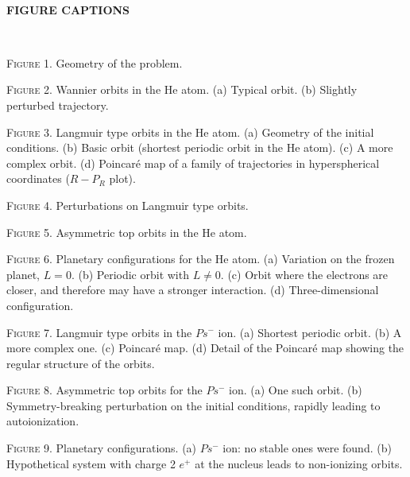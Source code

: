 \documentclass[thmsa]{article}
\begin{document}
\newpage 

\pagestyle{empty}\ 

\textbf{{\large \textbf{FIGURE CAPTIONS}}}

\smallskip\ 

\textsc{Figure} 1. Geometry of the problem.

\textsc{Figure} 2. Wannier orbits in the He atom. (a) Typical orbit. (b)
Slightly perturbed trajectory.

\textsc{Figure} 3. Langmuir type orbits in the He atom. (a) Geometry of the
initial conditions. (b) Basic orbit (shortest periodic orbit in the He
atom). (c) A more complex orbit. (d) Poincar\'e map of a family of
trajectories in hyperspherical coordinates ($R-P_R$ plot).

\textsc{Figure} 4. Perturbations on Langmuir type orbits.

\textsc{Figure} 5. Asymmetric top orbits in the He atom.

\textsc{Figure} 6. Planetary configurations for the He atom. (a) Variation
on the frozen planet, $L=0$. (b) Periodic orbit with $L\neq 0$. (c) Orbit
where the electrons are closer, and therefore may have a stronger
interaction. (d) Three-dimensional configuration.

\textsc{Figure} 7. Langmuir type orbits in the $Ps^{-}$ ion. (a) Shortest
periodic orbit. (b) A more complex one. (c) Poincar\'e map. (d) Detail of
the Poincar\'e map showing the regular structure of the orbits.

\textsc{Figure} 8. Asymmetric top orbits for the $Ps^{-}$ ion. (a) One such
orbit. (b) Symmetry-breaking perturbation on the initial conditions, rapidly
leading to autoionization.

\textsc{Figure} 9. Planetary configurations. (a) $Ps^{-}$ ion: no stable
ones were found. (b) Hypothetical system with charge 2 $e^{+}$ at the
nucleus leads to non-ionizing orbits.
\end{document}

